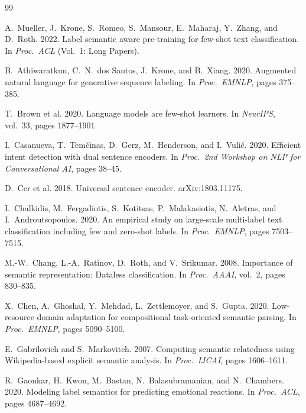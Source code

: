 \documentclass[11pt]{article}
\begin{document}
\begin{thebibliography}{99}
\small

 A.~Mueller, J.~Krone, S.~Romeo, S.~Mansour,
E.~Maharaj, Y.~Zhang, and D.~Roth. 2022. Label semantic aware pre-training
for few-shot text classification. In \emph{Proc.\ ACL} (Vol.\ 1: Long
Papers).

 B.~Athiwaratkun, C.~N.~dos Santos, J.~Krone, and
B.~Xiang. 2020. Augmented natural language for generative sequence labeling.
In \emph{Proc.\ EMNLP}, pages 375--385.

 T.~Brown et al. 2020. Language models are few-shot
learners. In \emph{NeurIPS}, vol.\ 33, pages 1877--1901.

 I.~Casanueva, T.~Tem\v{c}inas, D.~Gerz,
M.~Henderson, and I.~Vuli\'c. 2020. Efficient intent detection with dual
sentence encoders. In \emph{Proc.\ 2nd Workshop on NLP for Conversational
AI}, pages 38--45.

 D.~Cer et al. 2018. Universal sentence encoder.
arXiv:1803.11175.

 I.~Chalkidis, M.~Fergadiotis, S.~Kotitsas,
P.~Malakasiotis, N.~Aletras, and I.~Androutsopoulos. 2020. An empirical
study on large-scale multi-label text classification including few and
zero-shot labels. In \emph{Proc.\ EMNLP}, pages 7503--7515.

 M.-W.~Chang, L.-A.~Ratinov, D.~Roth, and V.~Srikumar.
2008. Importance of semantic representation: Dataless classification. In
\emph{Proc.\ AAAI}, vol.\ 2, pages 830--835.

 X.~Chen, A.~Ghoshal, Y.~Mehdad, L.~Zettlemoyer, and
S.~Gupta. 2020. Low-resource domain adaptation for compositional
task-oriented semantic parsing. In \emph{Proc.\ EMNLP}, pages 5090--5100.

 E.~Gabrilovich and S.~Markovitch. 2007. Computing
semantic relatedness using Wikipedia-based explicit semantic analysis. In
\emph{Proc.\ IJCAI}, pages 1606--1611.

 R.~Gaonkar, H.~Kwon, M.~Bastan, N.~Balasubramanian,
and N.~Chambers. 2020. Modeling label semantics for predicting emotional
reactions. In \emph{Proc.\ ACL}, pages 4687--4692.


\end{thebibliography}
\end{document}
